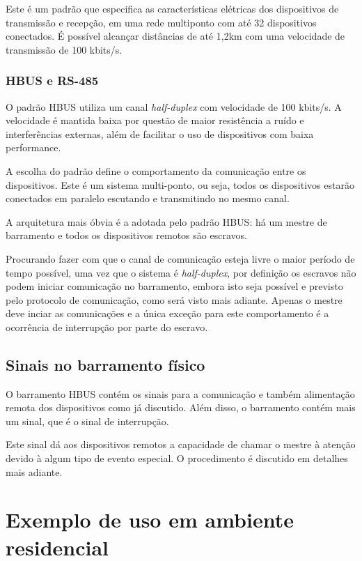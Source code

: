 \documentclass[11pt]{report}
\begin{document}
Este é um padrão que especifica as características elétricas dos dispositivos de transmissão e recepção, em uma rede multiponto com até 32 dispositivos conectados. É possível alcançar distâncias de até 1,2km com uma velocidade de transmissão de 100 kbits/s.

\subsubsection{HBUS e RS-485}

O padrão HBUS utiliza um canal \textit{half-duplex} com velocidade de 100 kbits/s. A velocidade é mantida baixa por questão de maior resistência a ruído e interferências externas, além de facilitar o uso de dispositivos com baixa performance.

A escolha do padrão define o comportamento da comunicação entre os dispositivos. Este é um sistema multi-ponto, ou seja, todos os dispositivos estarão conectados em paralelo escutando e transmitindo no mesmo canal. 

A arquitetura mais óbvia é a adotada pelo padrão HBUS: há um mestre de barramento e todos os dispositivos remotos são escravos.

Procurando fazer com que o canal de comunicação esteja livre o maior período de tempo possível, uma vez que o sistema é \textit{half-duplex}, por definição os escravos não podem iniciar comunicação no barramento, embora isto seja possível e previsto pelo protocolo de comunicação, como será visto mais adiante. Apenas o mestre deve inciar as comunicações e a única exceção para este comportamento é a ocorrência de interrupção por parte do escravo.

\subsection{Sinais no barramento físico}

O barramento HBUS contém os sinais para a comunicação e também alimentação remota dos dispositivos como já discutido. Além disso, o barramento contém mais um sinal, que é o sinal de interrupção.

Este sinal dá aos dispositivos remotos a capacidade de chamar o mestre à atenção devido à algum tipo de evento especial. O procedimento é discutido em detalhes mais adiante.

\section{Exemplo de uso em ambiente residencial}
\end{document}
